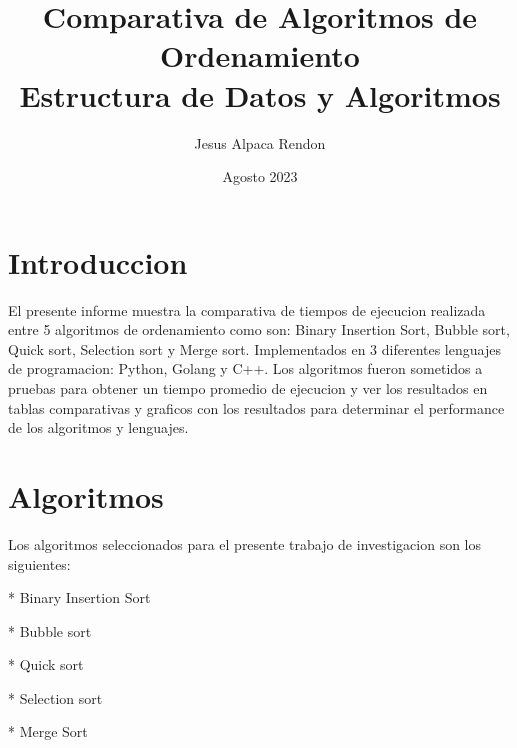 \documentclass[12pt]{article} %
\title{Comparativa de Algoritmos de Ordenamiento\\Estructura de Datos y Algoritmos}
\date{Agosto 2023}
\author{Jesus Alpaca Rendon}
\begin{document}
\maketitle
\section{Introduccion}
El presente informe muestra la comparativa de tiempos de ejecucion realizada entre 5 algoritmos de ordenamiento como son: Binary Insertion Sort, Bubble sort, Quick sort, Selection sort y Merge sort.
Implementados en 3 diferentes lenguajes de programacion: Python, Golang y C++. Los algoritmos fueron sometidos a pruebas para obtener un tiempo promedio de ejecucion y ver los resultados
en tablas comparativas y graficos con los resultados para determinar el performance de los algoritmos y lenguajes.
\section{Algoritmos}
Los algoritmos seleccionados para el presente trabajo de investigacion son los siguientes:

* Binary Insertion Sort

* Bubble sort

* Quick sort

* Selection sort

* Merge Sort
\end{document}
